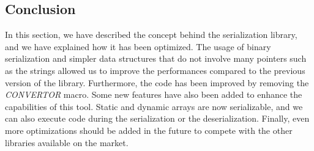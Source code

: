 \subsection{Conclusion}

In this section, we have described the concept behind the serialization library,
and we have explained how it has been optimized. The usage of binary
serialization and simpler data structures that do not involve many pointers such
as the strings allowed us to improve the performances compared to the previous
version of the library. Furthermore, the code has been improved by removing the
\textit{CONVERTOR} macro. Some new features have also been added to enhance the
capabilities of this tool. Static and dynamic arrays are now serializable, and
we can also execute code during the serialization or the deserialization.
Finally, even more optimizations should be added in the future to compete with
the other libraries available on the market.
